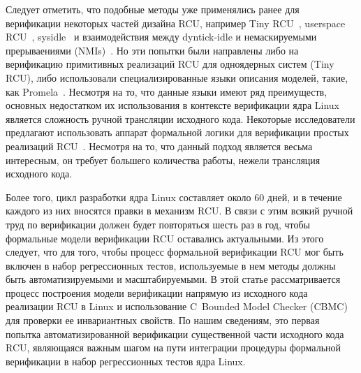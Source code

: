 Следует отметить, что подобные методы уже применялись ранее
для верификации некоторых частей дизайна RCU, например
Tiny RCU~\cite{VerificationChallenges}, userspace RCU~\cite{DesnoyersOSR13},
sysidle~\cite{VerificationChallenges} и взаимодействия между
dyntick-idle и немаскируемыми прерываениями (NMIs)~\cite{ValDyntickNMI}.
Но эти попытки были направлены либо на верификацию примитивных реализаций
RCU для одноядерных систем (Tiny RCU), либо использовали специализированные
языки описания моделей, такие, как Promela~\cite{HolzmannTSE97SPIN}.
Несмотря на то, что данные языки имеют ряд преимуществ,
основных недостатком их использования в контексте верификации ядра Linux
является сложность ручной трансляции исходного кода.
Некоторые исследователи предлагают использовать аппарат формальной логики для
верификации простых реализаций RCU~\cite{YangESOP13RCU,DreyerPLDI15RCU}.
Несмотря на то, что данный подход является весьма интересным,
он требует большего количества работы, нежели трансляция исходного кода.

Более того, цикл разработки ядра Linux составляет около 60 дней,
и в течение каждого из них вносятся правки в механизм RCU.
В связи с этим всякий ручной труд по верификации должен будет
повторяться шесть раз в год, чтобы формальные модели верификации RCU
оставались актуальными.
Из этого следует, что для того, чтобы процесс формальной верификации
RCU мог быть включен в набор регрессионных тестов, используемые в нем методы
должны быть автоматизируемыми и масштабируемыми.
В этой статье рассматривается процесс построения модели верификации напрямую из
исходного кода реализации RCU в Linux и использование
C~Bounded Model Checker (CBMC)~\cite{KroeningTACAS04CBMC}
для проверки ее инвариантных свойств.
По нашим сведениям, это первая попытка автоматизированной верификации
существенной части исходного кода RCU, являющаяся важным шагом на пути
интеграции процедуры формальной верификации в набор регрессионных
тестов ядра Linux.
